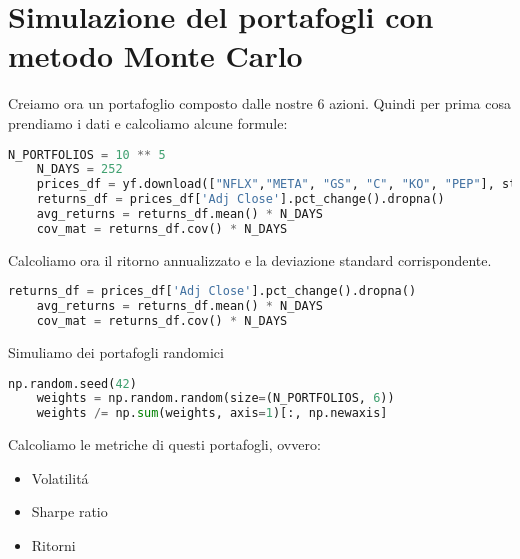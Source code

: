 \documentclass{report}
\begin{document}
\section{Simulazione del portafogli con metodo Monte Carlo}
Creiamo ora un portafoglio composto dalle nostre 6 azioni. Quindi per prima cosa prendiamo i dati e calcoliamo alcune formule:
\begin{lstlisting}[language=python]
    N_PORTFOLIOS = 10 ** 5
    N_DAYS = 252
    prices_df = yf.download(["NFLX","META", "GS", "C", "KO", "PEP"], start, end, adjusted=True)
    returns_df = prices_df['Adj Close'].pct_change().dropna()
    avg_returns = returns_df.mean() * N_DAYS
    cov_mat = returns_df.cov() * N_DAYS
\end{lstlisting}
Calcoliamo ora il ritorno annualizzato e la deviazione standard corrispondente.
\begin{lstlisting}[language=python]
    returns_df = prices_df['Adj Close'].pct_change().dropna()
    avg_returns = returns_df.mean() * N_DAYS
    cov_mat = returns_df.cov() * N_DAYS
\end{lstlisting}
Simuliamo dei portafogli randomici
\begin{lstlisting}[language=python]
    np.random.seed(42)
    weights = np.random.random(size=(N_PORTFOLIOS, 6))
    weights /= np.sum(weights, axis=1)[:, np.newaxis]
\end{lstlisting}
Calcoliamo le metriche di questi portafogli, ovvero:

\begin{itemize}[leftmargin=30pt, rightmargin=2cm]
\item Volatilitá
\item Sharpe ratio
\item Ritorni
\end{itemize}
\end{document}
